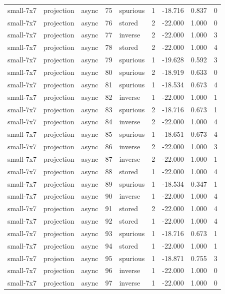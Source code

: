 \begin{tabular}{lllrlrrrr}
small-7x7 & projection & async & 75 & spurious & 1 & -18.716 & 0.837 & 0 \\
small-7x7 & projection & async & 76 & stored & 2 & -22.000 & 1.000 & 0 \\
small-7x7 & projection & async & 77 & inverse & 2 & -22.000 & 1.000 & 3 \\
small-7x7 & projection & async & 78 & stored & 2 & -22.000 & 1.000 & 4 \\
small-7x7 & projection & async & 79 & spurious & 1 & -19.628 & 0.592 & 3 \\
small-7x7 & projection & async & 80 & spurious & 2 & -18.919 & 0.633 & 0 \\
small-7x7 & projection & async & 81 & spurious & 1 & -18.534 & 0.673 & 4 \\
small-7x7 & projection & async & 82 & inverse & 1 & -22.000 & 1.000 & 1 \\
small-7x7 & projection & async & 83 & spurious & 2 & -18.716 & 0.673 & 1 \\
small-7x7 & projection & async & 84 & inverse & 2 & -22.000 & 1.000 & 4 \\
small-7x7 & projection & async & 85 & spurious & 1 & -18.651 & 0.673 & 4 \\
small-7x7 & projection & async & 86 & inverse & 2 & -22.000 & 1.000 & 3 \\
small-7x7 & projection & async & 87 & inverse & 2 & -22.000 & 1.000 & 1 \\
small-7x7 & projection & async & 88 & stored & 1 & -22.000 & 1.000 & 4 \\
small-7x7 & projection & async & 89 & spurious & 1 & -18.534 & 0.347 & 1 \\
small-7x7 & projection & async & 90 & inverse & 1 & -22.000 & 1.000 & 4 \\
small-7x7 & projection & async & 91 & stored & 2 & -22.000 & 1.000 & 4 \\
small-7x7 & projection & async & 92 & stored & 1 & -22.000 & 1.000 & 4 \\
small-7x7 & projection & async & 93 & spurious & 1 & -18.716 & 0.673 & 1 \\
small-7x7 & projection & async & 94 & stored & 1 & -22.000 & 1.000 & 1 \\
small-7x7 & projection & async & 95 & spurious & 1 & -18.871 & 0.755 & 3 \\
small-7x7 & projection & async & 96 & inverse & 1 & -22.000 & 1.000 & 0 \\
small-7x7 & projection & async & 97 & inverse & 1 & -22.000 & 1.000 & 0 \\

\end{tabular}
